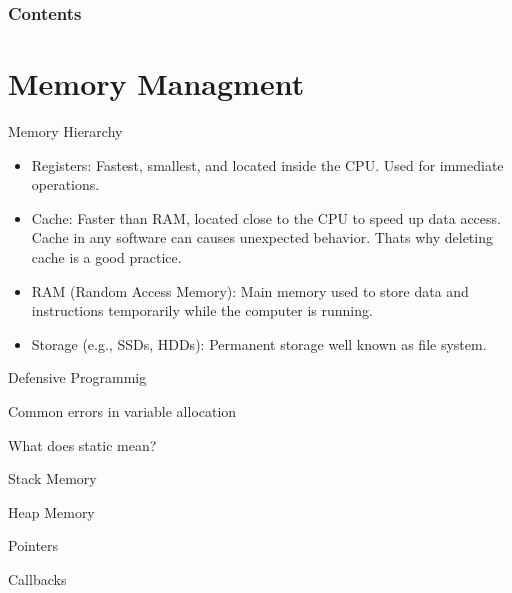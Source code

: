 \documentclass[10pt]{beamer}
\title[Universidad Panamericana]{}
\subtitle{FreeRTOS Architecture Part 1}
\author[]{Name}
\institute[ltonix@up.edu.mx]{Universidad Panamericana}
\date[Presentation \today]{Presentation \today}
\begin{document}
\frame{\titlepage}
\begin{frame}
\frametitle{Contents}
\tableofcontents
\end{frame}

\section{Memory Managment}

\begin{frame}{Memory Hierarchy}
  \begin{itemize}
    \item Registers: Fastest, smallest, and located inside the CPU. Used for immediate operations.
    \item Cache: Faster than RAM, located close to the CPU to speed up data access. Cache in any software can causes unexpected behavior. Thats why deleting cache is a good practice. 
    \item RAM (Random Access Memory): Main memory used to store data and instructions temporarily while the computer is running.
    \item Storage (e.g., SSDs, HDDs): Permanent storage well known as file system.
  \end{itemize}
\end{frame}

\begin{frame}{Defensive Programmig}

\end{frame}

\begin{frame}{Common errors in variable allocation}

\end{frame}

\begin{frame}{What does static mean?}

\end{frame}

\begin{frame}{Stack Memory}

\end{frame}

\begin{frame}{Heap Memory}

\end{frame}

\begin{frame}{Pointers}

\end{frame}

\begin{frame}{Callbacks}

\end{frame}
\end{document}
